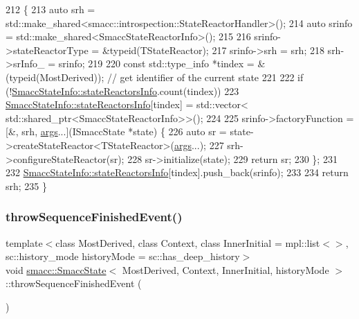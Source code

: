 \begin{DoxyCode}
212     \{
213       \textcolor{keyword}{auto} srh = std::make\_shared<smacc::introspection::StateReactorHandler>();
214       \textcolor{keyword}{auto} srinfo = std::make\_shared<SmaccStateReactorInfo>();
215 
216       srinfo->stateReactorType = &\textcolor{keyword}{typeid}(TStateReactor);
217       srinfo->srh = srh;
218       srh->srInfo\_ = srinfo;
219 
220       \textcolor{keyword}{const} std::type\_info *tindex = &(\textcolor{keyword}{typeid}(MostDerived)); \textcolor{comment}{// get identifier of the current state}
221 
222       \textcolor{keywordflow}{if} (!\hyperlink{classsmacc_1_1introspection_1_1SmaccStateInfo_abd1d6ca5060c87f6bd11fde3e5b2ac4d}{SmaccStateInfo::stateReactorsInfo}.count(tindex))
223         \hyperlink{classsmacc_1_1introspection_1_1SmaccStateInfo_abd1d6ca5060c87f6bd11fde3e5b2ac4d}{SmaccStateInfo::stateReactorsInfo}[tindex] = std::vector<
      std::shared\_ptr<SmaccStateReactorInfo>>();
224 
225       srinfo->factoryFunction = [&, srh, \hyperlink{namespacegenerate__debs_a75f9143e38df82d83b2e8a6f99cae02c}{args}...](ISmaccState *state) \{
226         \textcolor{keyword}{auto} sr = state->createStateReactor<TStateReactor>(\hyperlink{namespacegenerate__debs_a75f9143e38df82d83b2e8a6f99cae02c}{args}...);
227         srh->configureStateReactor(sr);
228         sr->initialize(state);
229         \textcolor{keywordflow}{return} sr;
230       \};
231 
232       \hyperlink{classsmacc_1_1introspection_1_1SmaccStateInfo_abd1d6ca5060c87f6bd11fde3e5b2ac4d}{SmaccStateInfo::stateReactorsInfo}[tindex].push\_back(srinfo);
233 
234       \textcolor{keywordflow}{return} srh;
235     \}
\end{DoxyCode}
\mbox{\label{classsmacc_1_1SmaccState_a49dcfc25824f7e083dd4b999c49ab2b6}} 
\subsubsection{\texorpdfstring{throw\+Sequence\+Finished\+Event()}{throwSequenceFinishedEvent()}}
{\footnotesize\ttfamily template$<$class Most\+Derived, class Context, class Inner\+Initial = mpl\+::list$<$$>$, sc\+::history\+\_\+mode history\+Mode = sc\+::has\+\_\+deep\+\_\+history$>$ \\
void \hyperlink{classsmacc_1_1SmaccState}{smacc\+::\+Smacc\+State}$<$ Most\+Derived, Context, Inner\+Initial, history\+Mode $>$\+::throw\+Sequence\+Finished\+Event (\begin{DoxyParamCaption}{ }\end{DoxyParamCaption})\hspace{0.3cm}{\ttfamily [inline]}}



